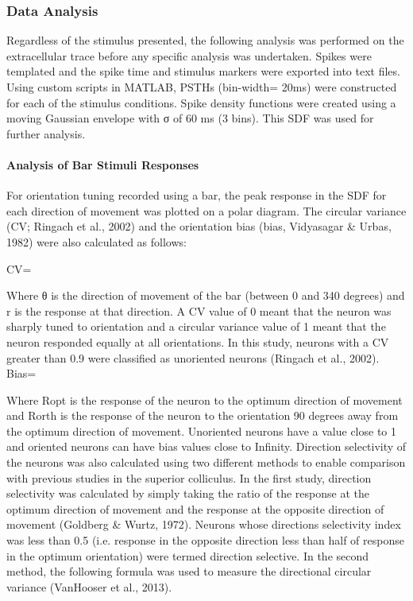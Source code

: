 	
	\subsubsection{Data Analysis}
	
	Regardless of the stimulus presented, the following analysis was performed on the extracellular trace before any specific analysis was undertaken. Spikes were templated and the spike time and stimulus markers were exported into text files. Using custom scripts in MATLAB, PSTHs (bin-width= 20ms) were constructed for each of the stimulus conditions.  Spike density functions were created using a moving Gaussian envelope with σ of 60 ms (3 bins). This SDF was used for further analysis.
	
	\paragraph{Analysis of Bar Stimuli Responses}
	
	For orientation tuning recorded using a bar, the peak response in the SDF for each direction of movement was plotted on a polar diagram. The circular variance (CV; Ringach et al., 2002) and the orientation bias (bias, Vidyasagar \& Urbas, 1982) were also calculated as follows:
	
	CV= 
	
	Where θ is the direction of movement of the bar (between 0 and 340 degrees) and r is the response at that direction. A CV value of 0 meant that the neuron was sharply tuned to orientation and a circular variance value of 1 meant that the neuron responded equally at all orientations. In this study, neurons with a CV greater than 0.9 were classified as unoriented neurons (Ringach et al., 2002).
	Bias=
	
	Where Ropt is the response of the neuron to the optimum direction of movement and Rorth is the response of the neuron to the orientation 90 degrees away from the optimum direction of movement. Unoriented neurons have a value close to 1 and oriented neurons can have bias values close to Infinity.
	Direction selectivity of the neurons was also calculated using two different methods to enable comparison with previous studies in the superior colliculus. In the first study, direction selectivity was calculated by simply taking the ratio of the response at the optimum direction of movement and the response at the opposite direction of movement (Goldberg \& Wurtz, 1972). Neurons whose directions selectivity index was less than 0.5 (i.e. response in the opposite direction less than half of response in the optimum orientation) were termed direction selective. In the second method, the following formula was used to measure the directional circular variance (VanHooser et al., 2013).
	

